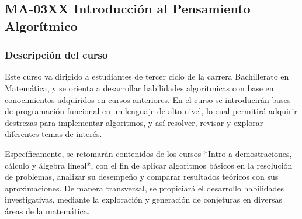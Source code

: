 \subsection*{MA-03XX Introducción al Pensamiento Algorítmico}

\begin{refsection}
\begin{table}[H]
\end{table}



\subsubsection*{Descripción del curso}

Este curso va dirigido a estudiantes de tercer ciclo de la carrera Bachillerato en Matemática, y se orienta a desarrollar habilidades algorítmicas con base en conocimientos adquiridos en cursos anteriores. En el curso se introducirán bases de programación funcional en un lenguaje de alto nivel, lo cual permitirá adquirir destrezas para implementar algoritmos, y así resolver, revisar y explorar diferentes temas de interés.

Específicamente, se retomarán contenidos de los cursos *Intro a demostraciones, cálculo y álgebra lineal*, con el fin de aplicar algoritmos básicos en la resolución de problemas, analizar su desempeño y comparar resultados teóricos con sus aproximaciones. 
De manera transversal, se propiciará el desarrollo habilidades investigativas, mediante la exploración y generación de conjeturas en diversas áreas de la matemática.


\end{refsection}
